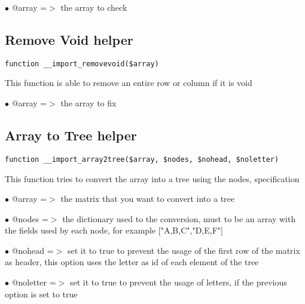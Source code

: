 \documentclass[a4paper]{book}
\begin{document}
\begin{compactitem}
\item[\color{myblue}$\bullet$] @array =$>$ the array to check
\end{compactitem}

\hypertarget{toc169}{}
\subsection{Remove Void helper}

\begin{lstlisting}
function __import_removevoid($array)
\end{lstlisting}

This function is able to remove an entire row or column if it is void

\begin{compactitem}
\item[\color{myblue}$\bullet$] @array =$>$ the array to fix
\end{compactitem}

\hypertarget{toc170}{}
\subsection{Array to Tree helper}

\begin{lstlisting}
function __import_array2tree($array, $nodes, $nohead, $noletter)
\end{lstlisting}

This function tries to convert the array into a tree using the nodes,
specification

\begin{compactitem}
\item[\color{myblue}$\bullet$] @array    =$>$ the matrix that you want to convert into a tree
\item[\color{myblue}$\bullet$] @nodes    =$>$ the dictionary used to the conversion, must to be an array with
             the fields used by each node, for example ["A,B,C","D,E,F"]
\item[\color{myblue}$\bullet$] @nohead   =$>$ set it to true to prevent the usage of the first row of the
             matrix as header, this option uses the letter as id of each
             element of the tree
\item[\color{myblue}$\bullet$] @noletter =$>$ set it to true to prevent the usage of letters, if the
             previous option is set to true
\end{compactitem}
\end{document}

